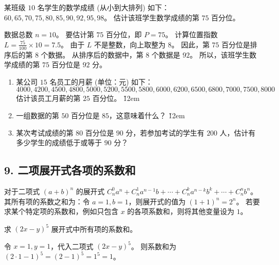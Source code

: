 \begin{example}
    某班级 $10$ 名学生的数学成绩 (从小到大排列) 如下：
    $60, 65, 70, 75, 80, 85, 90, 92, 95, 98$。
    估计该班学生数学成绩的第 $75$ 百分位。
\end{example}
\begin{solution}
    数据总数 $n=10$。
    要估计第 $75$ 百分位，即 $P=75$。
    计算位置指数 $L = \frac{75}{100} \times 10 = 7.5$。
    由于 $L$ 不是整数，向上取整为 $8$。
    因此，第 $75$ 百分位是排序后的第 $8$ 个数据。
    从排序后的数据中，第 $8$ 个数据是 $92$。
    所以，该班学生数学成绩的第 $75$ 百分位是 $92$ 分。
\end{solution}

\begin{problem}
\begin{enumerate}
    \item 某公司 $15$ 名员工的月薪 (单位：元) 如下：
          $$4000, 4200, 4500, 4800, 5000, 5200, 5500, 5800, 6000, 6200, 6500, 6800, 7000, 7500, 8000$$
          估计该员工月薪的第 $25$ 百分位。
          \v{12em}
    \item 一组数据的第 $50$ 百分位是 $85$，这意味着什么？
          \v{12em}
    \item 某次考试成绩的第 $80$ 百分位是 $90$ 分，若参加考试的学生有 $200$ 人，估计有多少学生的成绩低于或等于 $90$ 分？
\end{enumerate}
\end{problem}

\subsection*{9. 二项展开式各项的系数和}

\begin{theorem}
    对于二项式 $(a+b)^n$ 的展开式 $C_n^0 a^n + C_n^1 a^{n-1}b + \cdots + C_n^k a^{n-k}b^k + \cdots + C_n^n b^n$。
    其所有项的系数之和为：令 $a=1, b=1$，则展开式的值为 $(1+1)^n = 2^n$。
    若要求某个特定项的系数和，例如只包含 $x$ 的各项系数和，则将其他变量设为 $1$。
\end{theorem}

\begin{example}
    求 $(2x - y)^5$ 展开式中所有项的系数和。
\end{example}
\begin{solution}
    令 $x=1, y=1$，代入二项式 $(2x - y)^5$。
    则系数和为 $(2 \cdot 1 - 1)^5 = (2 - 1)^5 = 1^5 = 1$。
\end{solution}

